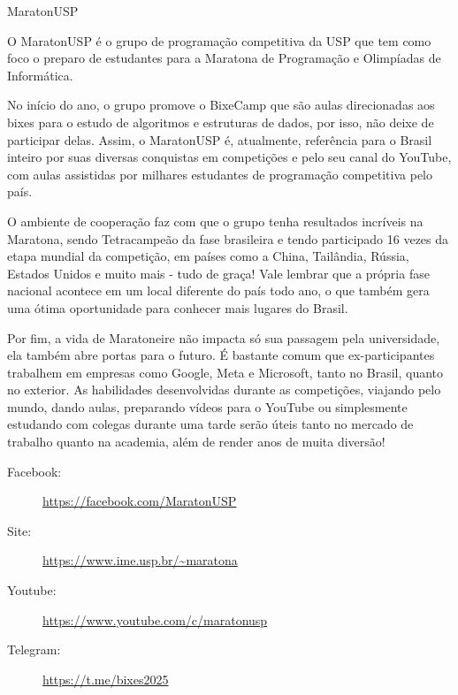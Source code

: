 \begin{subsecao}{MaratonUSP}


O MaratonUSP é o grupo de programação competitiva da USP que tem como foco o
preparo de estudantes para a Maratona de Programação e Olimpíadas de Informática.

No início do ano, o grupo promove o BixeCamp que são aulas direcionadas aos bixes
para o estudo de algoritmos e estruturas de dados, por isso, não deixe de
participar delas. Assim, o MaratonUSP é, atualmente, referência para o
Brasil inteiro por suas diversas conquistas em competições e pelo seu canal do
YouTube, com aulas assistidas por milhares estudantes de programação competitiva
pelo país.

O ambiente de cooperação faz com que o grupo tenha resultados incríveis na
Maratona, sendo Tetracampeão da fase brasileira e tendo participado 16
vezes da etapa mundial da competição, em países como a China, Tailândia,
Rússia, Estados Unidos e muito mais - tudo de graça! Vale lembrar que a própria
fase nacional acontece em um local diferente do país todo ano, o que também gera
uma ótima oportunidade para conhecer mais lugares do Brasil.

Por fim, a vida de Maratoneire não impacta só sua passagem pela universidade,
ela também abre portas para o futuro. É bastante comum que ex-participantes
trabalhem em empresas como Google, Meta e Microsoft, tanto no Brasil,
quanto no exterior. As habilidades desenvolvidas durante as competições,
viajando pelo mundo, dando aulas, preparando vídeos para o YouTube ou
simplesmente estudando com colegas durante uma tarde serão úteis tanto no
mercado de trabalho quanto na academia, além de render anos de muita diversão!

\begin{description}
\item[Facebook:] \url{https://facebook.com/MaratonUSP}
\item[Site:] \url{https://www.ime.usp.br/~maratona}
\item[Youtube:] \url{https://www.youtube.com/c/maratonusp}
\item[Telegram:] \url{https://t.me/bixes2025}
\end{description}

\end{subsecao}
